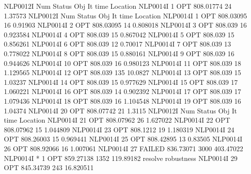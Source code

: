 NLP0012I 
              Num      Status      Obj             It       time                 Location
NLP0014I             1         OPT 808.01774       24 1.37573
NLP0012I 
              Num      Status      Obj             It       time                 Location
NLP0014I             1         OPT 808.03095       16 0.91903
NLP0014I             2         OPT 808.03095       14 0.808018
NLP0014I             3         OPT 808.039       16 0.923584
NLP0014I             4         OPT 808.039       15 0.867042
NLP0014I             5         OPT 808.039       15 0.856261
NLP0014I             6         OPT 808.039       12 0.70017
NLP0014I             7         OPT 808.039       13 0.778022
NLP0014I             8         OPT 808.039       15 0.880161
NLP0014I             9         OPT 808.039       16 0.944626
NLP0014I            10         OPT 808.039       16 0.980123
NLP0014I            11         OPT 808.039       18 1.129565
NLP0014I            12         OPT 808.039      135 10.0827
NLP0014I            13         OPT 808.039       15 1.03237
NLP0014I            14         OPT 808.039       15 0.977629
NLP0014I            15         OPT 808.039       17 1.060221
NLP0014I            16         OPT 808.039       14 0.902392
NLP0014I            17         OPT 808.039       17 1.079436
NLP0014I            18         OPT 808.039       16 1.104548
NLP0014I            19         OPT 808.039       16 1.04374
NLP0014I            20         OPT 808.07742       21 1.3115
NLP0012I 
              Num      Status      Obj             It       time                 Location
NLP0014I            21         OPT 808.07962       26 1.627022
NLP0014I            22         OPT 808.07962       15 1.044809
NLP0014I            23         OPT 808.1212       19 1.180319
NLP0014I            24         OPT 808.26003       15 0.969441
NLP0014I            25         OPT 808.42895       13 0.83505
NLP0014I            26         OPT 808.92066       16 1.007061
NLP0014I            27      FAILED 836.73071     3000 403.47022
NLP0014I *           1         OPT 859.27138     1352 119.89182   resolve robustness
NLP0014I            29         OPT 845.34739      243 16.820511

